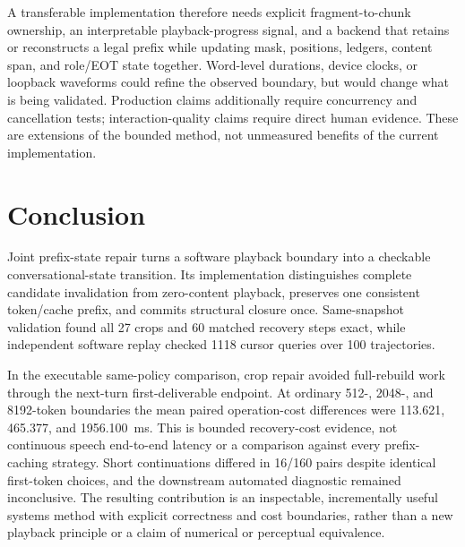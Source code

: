 A transferable implementation therefore needs explicit fragment-to-chunk ownership, an interpretable playback-progress signal, and a backend that retains or reconstructs a legal prefix while updating mask, positions, ledgers, content span, and role/EOT state together. Word-level durations, device clocks, or loopback waveforms could refine the observed boundary, but would change what is being validated. Production claims additionally require concurrency and cancellation tests; interaction-quality claims require direct human evidence. These are extensions of the bounded method, not unmeasured benefits of the current implementation.

\section{Conclusion}
\label{sec:conclusion}

Joint prefix-state repair turns a software playback boundary into a checkable conversational-state transition. Its implementation distinguishes complete candidate invalidation from zero-content playback, preserves one consistent token/cache prefix, and commits structural closure once. Same-snapshot validation found all 27 crops and 60 matched recovery steps exact, while independent software replay checked 1118 cursor queries over 100 trajectories.

In the executable same-policy comparison, crop repair avoided full-rebuild work through the next-turn first-deliverable endpoint. At ordinary 512-, 2048-, and 8192-token boundaries the mean paired operation-cost differences were 113.621, 465.377, and 1956.100~ms. This is bounded recovery-cost evidence, not continuous speech end-to-end latency or a comparison against every prefix-caching strategy. Short continuations differed in 16/160 pairs despite identical first-token choices, and the downstream automated diagnostic remained inconclusive. The resulting contribution is an inspectable, incrementally useful systems method with explicit correctness and cost boundaries, rather than a new playback principle or a claim of numerical or perceptual equivalence.
